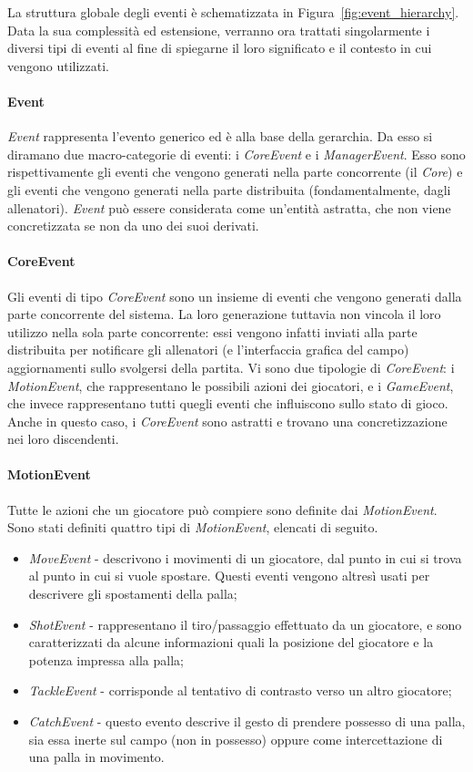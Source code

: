 La struttura globale degli eventi è schematizzata in Figura~\ref{fig:event_hierarchy}. Data la sua complessità ed estensione, verranno ora trattati singolarmente i diversi tipi di eventi al fine di spiegarne il loro significato e il contesto in cui vengono utilizzati.

\paragraph{Event} \textit{Event} rappresenta l'evento generico ed è alla base della gerarchia. Da esso si diramano due macro-categorie di eventi: i \textit{CoreEvent} e i \textit{ManagerEvent}. Esso sono rispettivamente gli eventi che vengono generati nella parte concorrente (il \emph{Core}) e gli eventi che vengono generati nella parte distribuita (fondamentalmente, dagli allenatori). \textit{Event} può essere considerata come un'entità astratta, che non viene concretizzata se non da uno dei suoi derivati.

\paragraph{CoreEvent} Gli eventi di tipo \textit{CoreEvent} sono un insieme di eventi che vengono generati dalla parte concorrente del sistema. La loro generazione tuttavia non vincola il loro utilizzo nella sola parte concorrente: essi vengono infatti inviati alla parte distribuita per notificare gli allenatori (e l'interfaccia grafica del campo) aggiornamenti sullo svolgersi della partita. Vi sono due tipologie di \textit{CoreEvent}: i \textit{MotionEvent}, che rappresentano le possibili azioni dei giocatori, e i \textit{GameEvent}, che invece rappresentano tutti quegli eventi che influiscono sullo stato di gioco. Anche in questo caso, i \textit{CoreEvent} sono astratti e trovano una concretizzazione nei loro discendenti.

\paragraph{MotionEvent} Tutte le azioni che un giocatore può compiere sono definite dai \textit{MotionEvent}. Sono stati definiti quattro tipi di \textit{MotionEvent}, elencati di seguito.

\begin{itemize}
	\item \textit{MoveEvent} - descrivono i movimenti di un giocatore, dal punto in cui si trova al punto in cui si vuole spostare. Questi eventi vengono altresì usati per descrivere gli spostamenti della palla;
	\item \textit{ShotEvent} - rappresentano il tiro/passaggio effettuato da un giocatore, e sono caratterizzati da alcune informazioni quali la posizione del giocatore e la potenza impressa alla palla;
	\item \textit{TackleEvent} - corrisponde al tentativo di contrasto verso un altro giocatore;
	\item \textit{CatchEvent} - questo evento descrive il gesto di prendere possesso di una palla, sia essa inerte sul campo (non in possesso) oppure come intercettazione di una palla in movimento.
\end{itemize}

